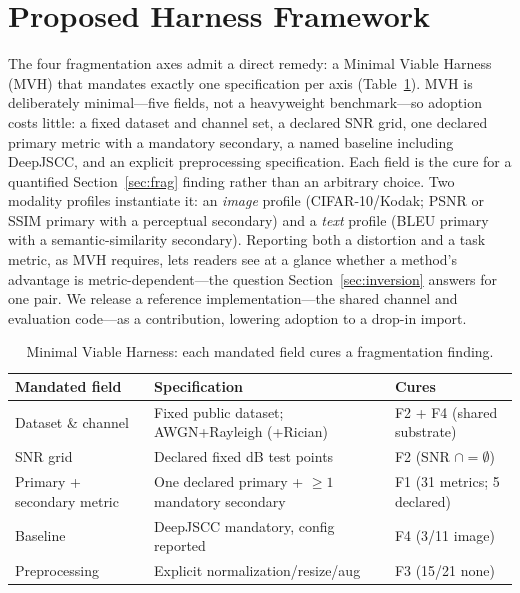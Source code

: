 \documentclass[conference]{IEEEtran}
\begin{document}
\section{Proposed Harness Framework}\label{sec:mvh}
The four fragmentation axes admit a direct remedy: a Minimal Viable Harness (MVH) that
mandates exactly one specification per axis (Table~\ref{tab:mvh}). MVH is deliberately
minimal---five fields, not a heavyweight benchmark---so adoption costs little: a fixed
dataset and channel set, a declared SNR grid, one declared primary metric with a
mandatory secondary, a named baseline including DeepJSCC, and an explicit preprocessing
specification. Each field is the cure for a quantified Section~\ref{sec:frag} finding
rather than an arbitrary choice. Two modality profiles instantiate it: an \emph{image}
profile (CIFAR-10/Kodak; PSNR or SSIM primary with a perceptual secondary) and a
\emph{text} profile (BLEU primary with a semantic-similarity secondary). Reporting both
a distortion and a task metric, as MVH requires, lets readers see at a glance whether a
method's advantage is metric-dependent---the question Section~\ref{sec:inversion} answers
for one pair. We release a reference
implementation---the shared channel and evaluation code---as a contribution, lowering
adoption to a drop-in import.

\begin{table}[t]
\centering
\footnotesize
\caption{Minimal Viable Harness: each mandated field cures a fragmentation finding.}
\label{tab:mvh}
\begin{tabular}{@{}p{1.6cm}p{3.4cm}p{2.0cm}@{}}
\toprule
Mandated field & Specification & Cures \\
\midrule
Dataset \& channel & Fixed public dataset; AWGN+Rayleigh (+Rician) & F2 + F4 (shared substrate) \\
SNR grid & Declared fixed dB test points & F2 (SNR $\cap=\emptyset$) \\
Primary + secondary metric & One declared primary + $\geq 1$ mandatory secondary & F1 (31 metrics; 5 declared) \\
Baseline & DeepJSCC mandatory, config reported & F4 (3/11 image) \\
Preprocessing & Explicit normalization/resize/aug & F3 (15/21 none) \\
\bottomrule
\end{tabular}
\end{table}
\end{document}

